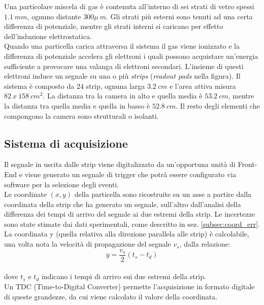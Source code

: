 \documentclass[8pt]{extarticle}
\begin{document}
Una particolare miscela di gas è contenuta all'interno di sei strati di vetro spessi $1.1 \ mm$, ognuno distante $300 \mu \ m$. Gli strati più esterni sono tenuti ad una certa differenza di potenziale, mentre gli strati interni si caricano per effetto dell'induzione elettrostatica. \\
Quando una particella carica attraversa il sistema il gas viene ionizzato e la differenza di potenziale accelera gli elettroni i quali possono acquistare un'energia sufficiente a 
provocare una valanga di elettroni secondari. L'insieme di questi elettroni induce un segnale su una o più \textit{strips} (\textit{readout pads} nella figura). Il sistema è composto da $24$ strip, ognuna larga $3.2 \ cm$ e l'area attiva misura $82 \ x \ 158 \ cm^2$. La distanza tra la camera in alto e quella media è $53.2 \ cm$, mentre la distanza tra quella media e quella in basso è $52.8 \ cm$.  Il resto degli elementi che compongono la camera sono strutturali o isolanti. \\

\subsection{Sistema di acquisizione}
Il segnale in uscita dalle strip viene digitalizzato da un'opportuna unità di Front-End e viene generato un segnale di trigger che potrà essere configurato via software per la selezione degli eventi.\\

Le coordinate $(x,y)$ della particella sono ricostruite su un asse a partire dalla coordinata della strip che ha generato un segnale, sull'altro dall'analisi della differenza dei tempi di arrivo del segnale ai due estremi della strip. Le incertezze sono state stimate dai dati sperimentali, come descritto in sez. \ref{subsec:coord_err}. \\

La coordinata y (quella relativa alla direzione parallela alle strip) è calcolabile, una volta nota la velocità di propagazione del segnale $v_s$, dalla relazione: \\
\[y = \frac{v_s}{2} (t_s - t_d) \] \\

dove $t_s$ e $t_d$ indicano i tempi di arrivo sui due estremi della strip. \\
Un TDC (Time-to-Digital Converter) permette l'acquisizione in formato digitale di queste grandezze, da cui viene calcolato il valore della coordinata. \\
\end{document}
